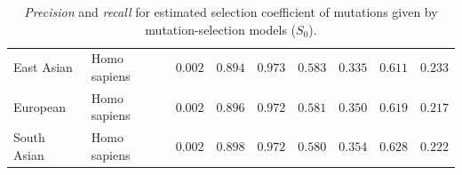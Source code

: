 \documentclass{article}
\newcommand{\Sphy}{S_{0}}
\providecommand{\DIFaddtex}[1]{{\protect\color{blue}\uwave{#1}}} %
\providecommand{\DIFdeltex}[1]{{\protect\color{red}\sout{#1}}}                      %
\providecommand{\DIFaddFL}[1]{\DIFadd{#1}} %
\providecommand{\DIFdelFL}[1]{\DIFdel{#1}} %
\providecommand{\DIFaddbeginFL}{} %
\providecommand{\DIFaddendFL}{} %
\providecommand{\DIFdelbeginFL}{} %
\providecommand{\DIFdelendFL}{} %
\providecommand{\DIFadd}[1]{\texorpdfstring{\DIFaddtex{#1}}{#1}} %
\providecommand{\DIFdel}[1]{\texorpdfstring{\DIFdeltex{#1}}{}} %
\newcommand{\DIFscaledelfig}{0.5}
\newlength{\DIFdelgraphicswidth} %
\newlength{\DIFdelgraphicsheight} %
\newcommand{\DIFaddincludegraphics}[2][]{{\color{blue}\fbox{\DIFOincludegraphics[#1]{#2}}}} %
\newcommand{\DIFdelincludegraphics}[2][]{%
\sbox{\DIFdelgraphicsbox}{\DIFOincludegraphics[#1]{#2}}%
\settoboxwidth{\DIFdelgraphicswidth}{\DIFdelgraphicsbox} %
\settoboxtotalheight{\DIFdelgraphicsheight}{\DIFdelgraphicsbox} %
\scalebox{\DIFscaledelfig}{%
\parbox[b]{\DIFdelgraphicswidth}{\usebox{\DIFdelgraphicsbox}\\[-\baselineskip] \rule{\DIFdelgraphicswidth}{0em}}\llap{\resizebox{\DIFdelgraphicswidth}{\DIFdelgraphicsheight}{%
\setlength{\unitlength}{\DIFdelgraphicswidth}%
\begin{picture}(1,1)%
\thicklines\linethickness{2pt} %
{\color[rgb]{1,0,0}\put(0,0){\framebox(1,1){}}}%
{\color[rgb]{1,0,0}\put(0,0){\line( 1,1){1}}}%
{\color[rgb]{1,0,0}\put(0,1){\line(1,-1){1}}}%
\end{picture}%
}\hspace*{3pt}}} %
} %
\DeclareRobustCommand{\DIFaddbeginFL}{\DIFOaddbeginFL \let\includegraphics\DIFaddincludegraphics} %
\DeclareRobustCommand{\DIFaddendFL}{\DIFOaddendFL \let\includegraphics\DIFOincludegraphics} %
\DeclareRobustCommand{\DIFdelbeginFL}{\DIFOdelbeginFL \let\includegraphics\DIFdelincludegraphics} %
\DeclareRobustCommand{\DIFdelendFL}{\DIFOaddendFL \let\includegraphics\DIFOincludegraphics} %
\begin{document}
\begin{table}[tb]
\begin{adjustbox}{width=\textwidth}
\begin{tabular}{||l|l|r||r|r||r|r||r|r||}
                East Asian & Homo sapiens & \DIFdelbeginFL \DIFdelFL{$ 0.002$ }\DIFdelendFL \DIFaddbeginFL \DIFaddFL{$ 4\times 10^{4}$ }\DIFaddendFL & \DIFdelbeginFL \DIFdelFL{$ 0.894$ }\DIFdelendFL \DIFaddbeginFL \DIFaddFL{$ 0.905$ }\DIFaddendFL & \DIFdelbeginFL \DIFdelFL{$ 0.973$ }\DIFdelendFL \DIFaddbeginFL \DIFaddFL{$ 0.978$ }\DIFaddendFL & \DIFdelbeginFL \DIFdelFL{$ 0.583$ }\DIFdelendFL \DIFaddbeginFL \DIFaddFL{$ 0.585$ }\DIFaddendFL & \DIFdelbeginFL \DIFdelFL{$ 0.335$ }\DIFdelendFL \DIFaddbeginFL \DIFaddFL{$ 0.325$ }\DIFaddendFL & \DIFdelbeginFL \DIFdelFL{$ 0.611$ }\DIFdelendFL \DIFaddbeginFL \DIFaddFL{$ 0.688$ }\DIFaddendFL & \DIFdelbeginFL \DIFdelFL{$ 0.233$ }\DIFdelendFL \DIFaddbeginFL \DIFaddFL{$ 0.249$ }\DIFaddendFL \\
                European & Homo sapiens & \DIFdelbeginFL \DIFdelFL{$ 0.002$ }\DIFdelendFL \DIFaddbeginFL \DIFaddFL{$4.2\times 10^{4}$ }\DIFaddendFL & \DIFdelbeginFL \DIFdelFL{$ 0.896$ }\DIFdelendFL \DIFaddbeginFL \DIFaddFL{$ 0.906$ }\DIFaddendFL & \DIFdelbeginFL \DIFdelFL{$ 0.972$ }\DIFdelendFL \DIFaddbeginFL \DIFaddFL{$ 0.978$ }\DIFaddendFL & \DIFdelbeginFL \DIFdelFL{$ 0.581$ }\DIFdelendFL \DIFaddbeginFL \DIFaddFL{$ 0.584$ }\DIFaddendFL & \DIFdelbeginFL \DIFdelFL{$ 0.350$ }\DIFdelendFL \DIFaddbeginFL \DIFaddFL{$ 0.329$ }\DIFaddendFL & \DIFdelbeginFL \DIFdelFL{$ 0.619$ }\DIFdelendFL \DIFaddbeginFL \DIFaddFL{$ 0.688$ }\DIFaddendFL & \DIFdelbeginFL \DIFdelFL{$ 0.217$ }\DIFdelendFL \DIFaddbeginFL \DIFaddFL{$ 0.248$ }\DIFaddendFL \\
                South Asian & Homo sapiens & \DIFdelbeginFL \DIFdelFL{$ 0.002$ }\DIFdelendFL \DIFaddbeginFL \DIFaddFL{$4.4\times 10^{4}$ }\DIFaddendFL & \DIFdelbeginFL \DIFdelFL{$ 0.898$ }\DIFdelendFL \DIFaddbeginFL \DIFaddFL{$ 0.908$ }\DIFaddendFL & \DIFdelbeginFL \DIFdelFL{$ 0.972$ }\DIFdelendFL \DIFaddbeginFL \DIFaddFL{$ 0.978$ }\DIFaddendFL & \DIFdelbeginFL \DIFdelFL{$ 0.580$ }\DIFdelendFL \DIFaddbeginFL \DIFaddFL{$ 0.584$ }\DIFaddendFL & \DIFdelbeginFL \DIFdelFL{$ 0.354$ }\DIFdelendFL \DIFaddbeginFL \DIFaddFL{$ 0.342$ }\DIFaddendFL & \DIFdelbeginFL \DIFdelFL{$ 0.628$ }\DIFdelendFL \DIFaddbeginFL \DIFaddFL{$ 0.691$ }\DIFaddendFL & \DIFdelbeginFL \DIFdelFL{$ 0.222$ }\DIFdelendFL \DIFaddbeginFL \DIFaddFL{$ 0.224$ }\DIFaddendFL \\
                \bottomrule
            \end{tabular}
        \end{adjustbox}
        \caption{
            \textit{Precision} and \textit{recall} for estimated selection coefficient of mutations given by mutation-selection models ($\Sphy$).
}
\end{table}
\end{document}
